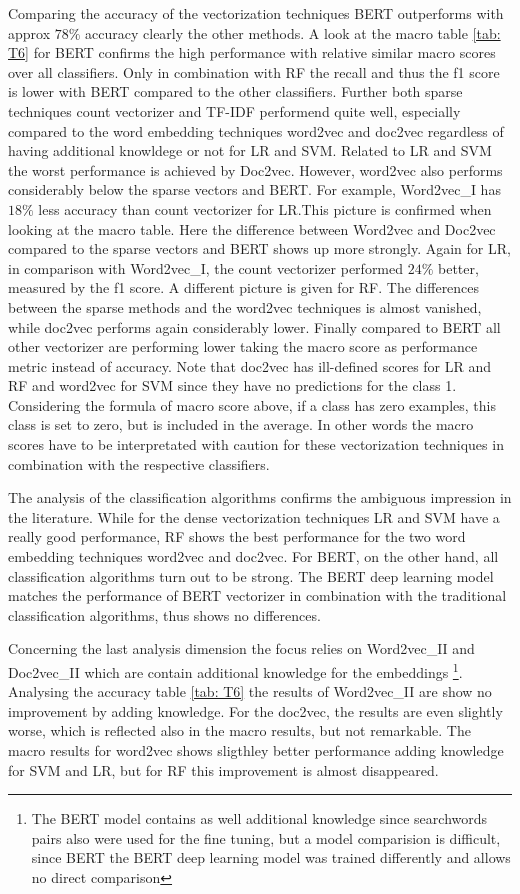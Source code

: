 \documentclass[12pt, a4paper, titlepage]{article}
\begin{document}
Comparing the accuracy of the vectorization techniques \ac{BERT} outperforms with approx $78\%$ accuracy clearly the other methods. A look at the macro table \ref{tab: T6} for BERT confirms the high performance with relative similar macro scores over all classifiers. Only in combination with \ac{RF} the recall and thus the f1 score is lower with \ac{BERT} compared to the other classifiers. Further both sparse techniques count vectorizer and \ac{TF-IDF} performend quite well, especially compared to the word embedding techniques word2vec and doc2vec regardless of having additional knowldege or not for \ac{LR} and \ac{SVM}. Related to \ac{LR} and \ac{SVM} the worst performance is achieved by Doc2vec. However, word2vec also performs considerably below the sparse vectors and \ac{BERT}. For example, Word2vec\_I has $18\%$ less accuracy than count vectorizer for \ac{LR}.This picture is confirmed when looking at the macro table. Here the difference between Word2vec and Doc2vec compared to the sparse vectors and BERT shows up more strongly. Again for \ac{LR}, in comparison with Word2vec\_I, the count vectorizer performed $24\%$ better, measured by the f1 score. A different picture is given for \ac{RF}. The differences between the sparse methods and the word2vec techniques is almost vanished, while doc2vec performs again considerably lower. Finally compared to \ac{BERT} all other vectorizer are performing lower taking the macro score as performance metric instead of accuracy. Note that doc2vec has ill-defined scores for \ac{LR} and \ac{RF} and word2vec for \ac{SVM} since they have no predictions for the class 1. Considering the formula of macro score above, if a class has zero examples, this class is set to zero, but is included in the average. In other words the macro scores have to be interpretated with caution for these vectorization techniques in combination with the respective classifiers. 

The analysis of the classification algorithms confirms the ambiguous impression in the literature. While for the dense vectorization techniques LR and SVM have a really good performance, RF shows the best performance for the two word embedding techniques word2vec and doc2vec. For BERT, on the other hand, all classification algorithms turn out to be strong. The BERT deep learning model matches the performance of BERT vectorizer in combination with the traditional classification algorithms, thus shows no differences. 

Concerning the last analysis dimension the focus relies on Word2vec\_II and Doc2vec\_II which are contain additional knowledge for the embeddings \footnote{The \ac{BERT} model contains as well additional knowledge since searchwords pairs also were used for the fine tuning, but a model comparision is difficult, since \ac{BERT} the \ac{BERT} deep learning model was trained differently and allows no direct comparison}. Analysing the accuracy table \ref{tab: T6} the results of Word2vec\_II are show no improvement by adding knowledge. For the doc2vec, the results are even slightly worse, which is reflected also in the macro results, but not remarkable. The macro results for word2vec shows sligthley better performance adding knowledge for \ac{SVM} and \ac{LR}, but for \ac{RF} this improvement is almost disappeared.
\end{document}
